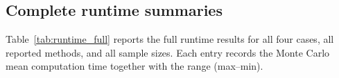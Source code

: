 \documentclass[lineno]{biometrika}
\begin{document}
\subsection{Complete runtime summaries}\label{app:runtime}

Table~\ref{tab:runtime_full} reports the full runtime results for all four cases, all reported methods, and all sample
sizes. Each entry records the Monte Carlo mean computation time together with the range (max--min).


\end{document}
